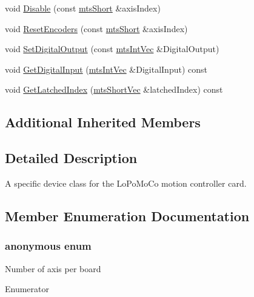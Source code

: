 \begin{DoxyCompactItemize}
\item 
void \hyperlink{classmts_lo_po_mo_co_a55a7c4103f18fb9b3279ed12da42849d}{Disable} (const \hyperlink{mts_generic_object_proxy_8h_a169c76d3ebc9c8cf6c47d54425dc5097}{mts\-Short} \&axis\-Index)
\item 
void \hyperlink{classmts_lo_po_mo_co_a95a68b16d6a6b2e7799b4cd103786056}{Reset\-Encoders} (const \hyperlink{mts_generic_object_proxy_8h_a169c76d3ebc9c8cf6c47d54425dc5097}{mts\-Short} \&axis\-Index)
\item 
void \hyperlink{classmts_lo_po_mo_co_abf4a21b18b765979767e9a582c206bff}{Set\-Digital\-Output} (const \hyperlink{mts_vector_8h_a15d098f238910e70dc542de74110a22e}{mts\-Int\-Vec} \&Digital\-Output)
\item 
void \hyperlink{classmts_lo_po_mo_co_a03f8a16147fba1d76ab98adb3603b673}{Get\-Digital\-Input} (\hyperlink{mts_vector_8h_a15d098f238910e70dc542de74110a22e}{mts\-Int\-Vec} \&Digital\-Input) const 
\item 
void \hyperlink{classmts_lo_po_mo_co_a3e155c3cd605b815fe89878a502a7614}{Get\-Latched\-Index} (\hyperlink{mts_vector_8h_a70974166b1900882680f3002b69e11c5}{mts\-Short\-Vec} \&latched\-Index) const 
\end{DoxyCompactItemize}
\subsection*{Additional Inherited Members}


\subsection{Detailed Description}
A specific device class for the Lo\-Po\-Mo\-Co motion controller card. 

\subsection{Member Enumeration Documentation}
\hypertarget{classmts_lo_po_mo_co_a364fb83f87aad0f9125c684157520496}{\subsubsection[{anonymous enum}]{\setlength{\rightskip}{0pt plus 5cm}anonymous enum}}\label{classmts_lo_po_mo_co_a364fb83f87aad0f9125c684157520496}
Number of axis per board \begin{Desc}
\item[Enumerator]\par
\begin{description}
\item[{\em 
\hypertarget{classmts_lo_po_mo_co_a364fb83f87aad0f9125c684157520496ac6dba0b930a9af0a1804587423ca4878}{N\-B\-\_\-\-A\-X\-I\-S}\label{classmts_lo_po_mo_co_a364fb83f87aad0f9125c684157520496ac6dba0b930a9af0a1804587423ca4878}
}]\end{description}
\end{Desc}


